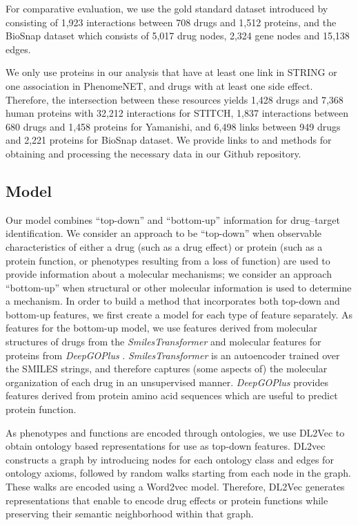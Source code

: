 \documentclass{bioinfo}
\renewcommand{\cite}{\citep}
\begin{document}
For comparative evaluation, we use the gold standard dataset
introduced by \citet{Yamanishi2008} consisting of 1,923 interactions
between 708 drugs and 1,512 proteins, and the BioSnap dataset
\cite{BioSnap2018} which consists of 5,017 drug nodes, 2,324 gene
nodes and 15,138 edges.

We only use proteins in our analysis that have at least one link in
STRING or one association in PhenomeNET, and drugs with at least one
side effect. Therefore, the intersection between these resources
yields 1,428 drugs and 7,368 human proteins with 32,212 interactions
for STITCH, 1,837 interactions between 680 drugs and 1,458 proteins
for Yamanishi, and 6,498 links between 949 drugs and 2,221 proteins
for BioSnap dataset. We provide links to and methods for obtaining and
processing the necessary data in our Github repository.

 
\subsection{Model}

Our model combines ``top-down'' and ``bottom-up'' information for
drug--target identification. We consider an approach to be
``top-down'' when observable characteristics of either a drug (such as
a drug effect) or protein (such as a protein function, or phenotypes
resulting from a loss of function) are used to provide information
about a molecular mechanisms; we consider an approach ``bottom-up''
when structural or other molecular information is used to determine a
mechanism.  In order to build a method that incorporates both top-down
and bottom-up features, we first create a model for each type of
feature separately.  As features for the bottom-up model, we use
features derived from molecular structures of drugs from the
\textit{SmilesTransformer} \citep{SmilesTransformer} and molecular
features for proteins from \textit{DeepGOPlus}
\citep{DeepGoPlus}. \textit{SmilesTransformer} is an autoencoder
trained over the SMILES strings, and therefore captures (some aspects
of) the molecular organization of each drug in an unsupervised manner.
\textit{DeepGOPlus} provides features derived from protein amino acid
sequences which are useful to predict protein function.

As phenotypes and functions are encoded through ontologies, we use
DL2Vec \citep{DL2vec2020} to obtain ontology based representations for
use as top-down features. DL2vec constructs a graph by introducing
nodes for each ontology class and edges for ontology axioms, followed
by random walks starting from each node in the graph. These walks are
encoded using a Word2vec \citep{Word2vec2013} model. Therefore, DL2Vec
generates representations that enable to encode drug effects or protein
functions while preserving their semantic neighborhood within that
graph.
\end{document}
